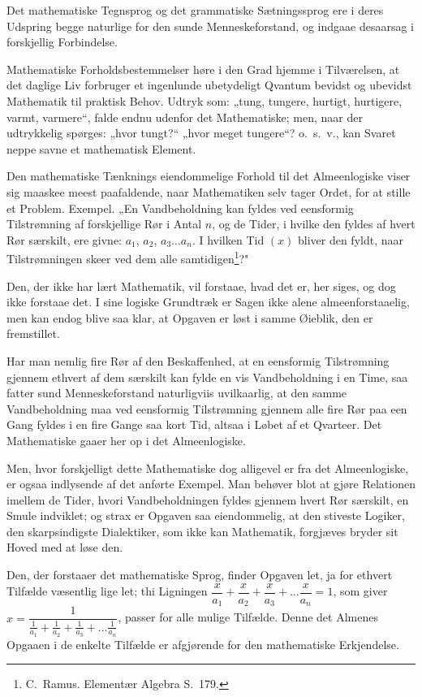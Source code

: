 \documentclass[12pt]{book}
\newcommand{\opage}[1]{\marginnote{\footnotesize\textit{[#1]}}}
\begin{document}
Det mathematiske Tegnsprog og det grammatiske Sætningssprog ere i deres Udspring
begge naturlige for den sunde Menneskeforstand, og indgaae desaarsag i
forskjellig Forbindelse.

Mathematiske Forholdsbestemmelser høre i den Grad hjemme i Tilværelsen, at det
daglige Liv forbruger et ingenlunde ubetydeligt Qvantum bevidst og ubevidst
Mathematik til praktisk Behov. Udtryk som: „tung, tungere, hurtigt, hurtigere,
varmt, varmere“, falde endnu udenfor det Mathematiske; men, naar der udtrykkelig
spørges: „hvor tungt?“
\opage{13} „hvor meget tungere“? o.\ s.\ v., kan Svaret neppe savne et mathematisk Element.

Den mathematiske Tænknings eiendommelige Forhold til det Almeenlogiske viser
sig maaskee meest paafaldende, naar Mathematiken selv tager Ordet, for at stille
et Problem. Exempel. „En Vandbeholdning kan fyldes ved eensformig Tilstrømning
af forskjellige Rør i Antal $n$, og de Tider, i hvilke den fyldes af hvert Rør
særskilt, ere givne: $a_1$, $a_2$, $a_3\dots a_n$. I hvilken Tid $(x)$ bliver den
fyldt, naar Tilstrømningen skeer ved dem alle samtidigen\footnote{C.\ Ramus.
Elementær Algebra S.\ 179.}?"

Den, der ikke har lært Mathematik, vil forstaae, hvad det er, her siges, og dog
ikke forstaae det. I sine logiske Grundtræk er Sagen ikke alene
almeenforstaaelig, men kan endog blive saa klar, at Opgaven er løst i samme
Øieblik, den er fremstillet.

Har man nemlig fire Rør af den Beskaffenhed, at en eensformig Tilstrømning
gjennem ethvert af dem særskilt kan fylde en vis Vandbeholdning i en Time, saa
fatter sund Menneskeforstand naturligviis uvilkaarlig, at den samme
Vandbeholdning maa ved eensformig Tilstrømning gjennem alle fire Rør paa een Gang
fyldes i en fire Gange saa kort Tid, altsaa i Løbet af et Qvarteer. Det
Mathematiske gaaer her op i det Almeenlogiske.

Men, hvor forskjelligt dette Mathematiske dog alligevel er fra det
Almeenlogiske, er ogsaa indlysende af det anførte Exempel. Man behøver blot at
gjøre Relationen imellem de Tider, hvori Vandbeholdningen fyldes gjennem hvert
Rør særskilt, en Smule indviklet; og strax er Opgaven saa eiendommelig, at den
stiveste Logiker, den skarpsindigste Dialektiker, som ikke kan Mathematik,
forgjæves bryder sit Hoved med at løse den.

Den, der forstaaer det mathematiske Sprog, finder Opgaven let, ja for ethvert
Tilfælde væsentlig lige let; thi
\opage{14} Ligningen $\dfrac{x}{a_1}+\dfrac{x}{a_2}+\dfrac{x}{a_3}+\dots\dfrac{x}{a_n}=1$,
som giver $x = \dfrac{1}{\frac{1}{a_1}+\frac{1}{a_2}+\frac{1}{a_3}+\dots
\frac{1}{a_n}}$, passer for alle mulige Tilfælde. Denne det Almenes Opgaaen i de
enkelte Tilfælde er afgjørende for den mathematiske Erkjendelse.
\end{document}
